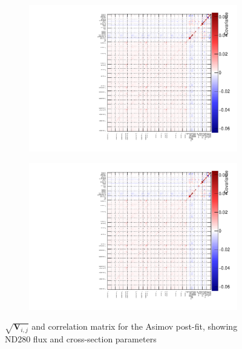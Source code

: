 \begin{figure}[h]
	\begin{subfigure}[t]{0.49\textwidth}
		\includegraphics[width=\textwidth, trim={0mm 0mm 0mm 0mm}, clip,page=5]{figures/mach3/Asimov/2017b_NewDet_NewData_Asimov_Long_0_drawCorr.pdf}
	\end{subfigure}
	\begin{subfigure}[t]{0.49\textwidth}
		\includegraphics[width=\textwidth, trim={0mm 0mm 0mm 0mm}, clip,page=6]{figures/mach3/Asimov/2017b_NewDet_NewData_Asimov_Long_0_drawCorr.pdf}
	\end{subfigure}
	\caption{$\sqrt{\mathbf{V}_{i,j}}$ and correlation matrix for the Asimov post-fit, showing ND280 flux and cross-section parameters}
	\label{fig:asimov_nd_corr}
\end{figure}

